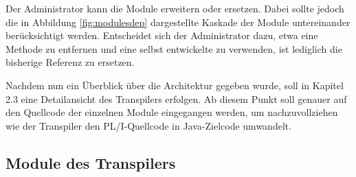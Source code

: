 Der Administrator kann die Module erweitern oder ersetzen.
Dabei sollte jedoch die in Abbildung \ref{fig:modulesdep} dargestellte Kaskade der Module untereinander berücksichtigt werden.
Entscheidet sich der Administrator dazu, etwa eine Methode zu entfernen und eine selbst entwickelte zu verwenden, ist lediglich die bisherige 
Referenz zu ersetzen.

Nachdem nun ein Überblick über die Architektur gegeben wurde, soll in Kapitel 2.3 eine Detailansicht des Transpilers erfolgen.
Ab diesem Punkt soll genauer auf den Quellcode der einzelnen Module eingegangen werden, um nachzuvollziehen wie der Transpiler den PL/I-Quellcode
in Java-Zielcode umwandelt.


 \pagebreak
\subsection{Module des Transpilers}

